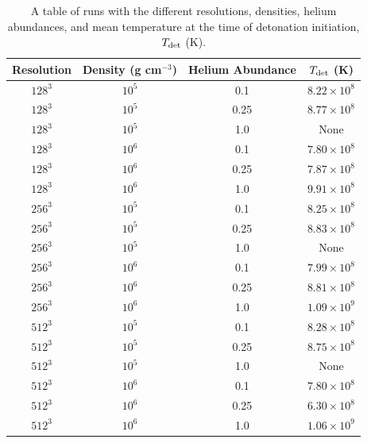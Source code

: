 \begin{table}[!htb]
        \caption[A table of helium-carbon-oxygen runs with different resolution, RMS velocity and mean temperature..]{A table of runs with the different resolutions, densities, helium abundances, and mean temperature at the time of detonation initiation, $T_{\rm det}$ (K).}
  \begin{center}
      \begin{tabular}{|c|c|c|c|}
        \hline
              Resolution & Density (g cm$^{-3}$) & Helium Abundance & $T_{\rm det}$ (K)\\
        \hline\hline
        $128^3$   & $10^5$ & 0.1 & $8.22 \times 10^8$  \\
        $128^3$   & $10^5$ & 0.25 & $8.77 \times 10^8$  \\
        $128^3$   & $10^5$ & 1.0 & None  \\
        $128^3$   & $10^6$ & 0.1 & $7.80 \times 10^8$  \\
        $128^3$   & $10^6$ & 0.25 & $7.87 \times 10^8$  \\
        $128^3$   & $10^6$ & 1.0 & $9.91 \times 10^8$  \\
        $256^3$   & $10^5$ & 0.1 & $8.25 \times 10^8$  \\
        $256^3$   & $10^5$ & 0.25 & $8.83 \times 10^8$  \\
        $256^3$   & $10^5$ & 1.0 & None  \\
        $256^3$   & $10^6$ & 0.1 & $7.99 \times 10^8$  \\
        $256^3$   & $10^6$ & 0.25 & $8.81 \times 10^8$  \\
        $256^3$   & $10^6$ & 1.0 & $1.09 \times 10^9$  \\
        $512^3$   & $10^5$ & 0.1 & $8.28 \times 10^8$  \\
        $512^3$   & $10^5$ & 0.25 & $8.75 \times 10^8$  \\
        $512^3$   & $10^5$ & 1.0 & None  \\
        $512^3$   & $10^6$ & 0.1 & $7.80 \times 10^8$  \\
        $512^3$   & $10^6$ & 0.25 & $6.30 \times 10^8$  \\
        $512^3$   & $10^6$ & 1.0 & $1.06 \times 10^9$  \\
        \hline
   \end{tabular}
  \end{center}
  \label{runs}
\end{table}

